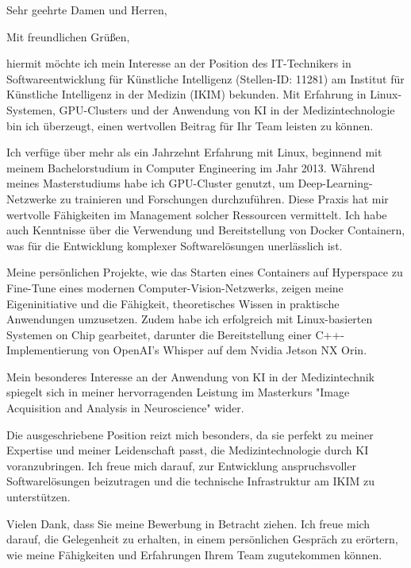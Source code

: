 \documentclass[11pt,a4paper,skipsamekey]{moderncv}
\begin{document}
	\date{\today}
	\opening{Sehr geehrte Damen und Herren,}
	\closing{Mit freundlichen Grüßen,}
	\makelettertitle
	
	hiermit möchte ich mein Interesse an der Position des IT-Technikers in Softwareentwicklung für Künstliche Intelligenz (Stellen-ID: 11281) am Institut für Künstliche Intelligenz in der Medizin (IKIM) bekunden. Mit Erfahrung in Linux-Systemen, GPU-Clusters und der Anwendung von KI in der Medizintechnologie bin ich überzeugt, einen wertvollen Beitrag für Ihr Team leisten zu können.
	
	Ich verfüge über mehr als ein Jahrzehnt Erfahrung mit Linux, beginnend mit meinem Bachelorstudium in Computer Engineering im Jahr 2013. Während meines Masterstudiums habe ich GPU-Cluster genutzt, um Deep-Learning-Netzwerke zu trainieren und Forschungen durchzuführen. Diese Praxis hat mir wertvolle Fähigkeiten im Management solcher Ressourcen vermittelt. 
	Ich habe auch Kenntnisse über die Verwendung und Bereitstellung von Docker Containern, was für die Entwicklung komplexer Softwarelösungen unerlässlich ist.
	
	Meine persönlichen Projekte, wie das Starten eines Containers auf Hyperspace zu Fine-Tune eines modernen Computer-Vision-Netzwerks, zeigen meine Eigeninitiative und die Fähigkeit, theoretisches Wissen in praktische Anwendungen umzusetzen. Zudem habe ich erfolgreich mit Linux-basierten Systemen on Chip gearbeitet, darunter die Bereitstellung einer C++-Implementierung von OpenAI's Whisper auf dem Nvidia Jetson NX Orin.
	
	Mein besonderes Interesse an der Anwendung von KI in der Medizintechnik spiegelt sich in meiner hervorragenden Leistung im Masterkurs "Image Acquisition and Analysis in Neuroscience" wider. 
	
	Die ausgeschriebene Position reizt mich besonders, da sie perfekt zu meiner Expertise und meiner Leidenschaft passt, die Medizintechnologie durch KI voranzubringen. Ich freue mich darauf, zur Entwicklung anspruchsvoller Softwarelösungen beizutragen und die technische Infrastruktur am IKIM zu unterstützen.
	
	Vielen Dank, dass Sie meine Bewerbung in Betracht ziehen. Ich freue mich darauf, die Gelegenheit zu erhalten, in einem persönlichen Gespräch zu erörtern, wie meine Fähigkeiten und Erfahrungen Ihrem Team zugutekommen können.
	
\end{document}
